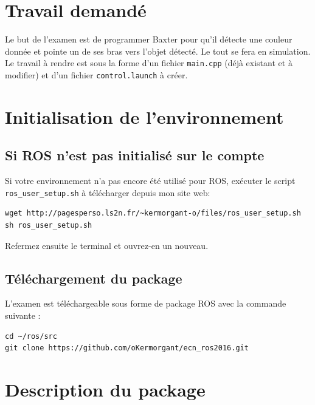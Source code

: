 \documentclass{ecnreport}
\begin{document}


\section{Travail demandé}

Le but de l'examen est de programmer Baxter pour qu'il détecte une couleur donnée et pointe un de ses bras vers l'objet détecté. Le tout se fera en simulation.
Le travail à rendre est sous la forme d'un fichier \texttt{main.cpp} (déjà existant et à modifier) et d'un fichier \texttt{control.launch} à créer.

\section{Initialisation de l'environnement}
  
\subsection{Si ROS n'est pas initialisé sur le compte}

Si votre environnement n'a pas encore été utilisé pour ROS, exécuter le script \texttt{ros\_user\_setup.sh} à télécharger depuis mon site web:
\begin{lstlisting}
wget http://pagesperso.ls2n.fr/~kermorgant-o/files/ros_user_setup.sh
sh ros_user_setup.sh
\end{lstlisting}
Refermez ensuite le terminal et ouvrez-en un nouveau.

\subsection{Téléchargement du package}

L'examen est téléchargeable sous forme de package ROS avec la commande suivante : 
\begin{center}
\begin{lstlisting}
cd ~/ros/src
git clone https://github.com/oKermorgant/ecn_ros2016.git
\end{lstlisting}
\end{center}



\section{Description du package}
\end{document}

